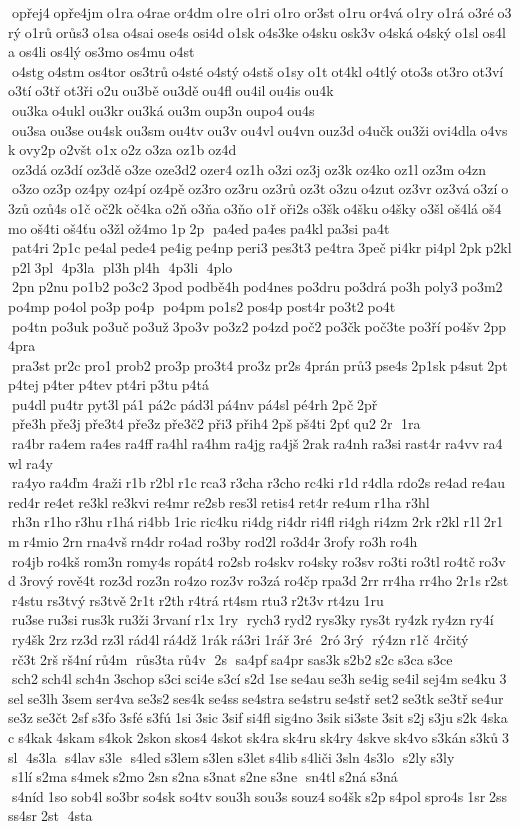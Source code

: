  opřej4 opře4jm o1ra o4rae or4dm o1re o1ri o1ro or3st o1ru or4vá o1ry o1rá o3ré o3rý o1rů orůs3 o1sa o4sai ose4s osi4d o1sk o4s3ke o4sku osk3v o4ská o4ský o1sl os4la os4li os4lý os3mo os4mu o4st  o4stg o4stm os4tor os3trů o4sté o4stý o4stš o1sy o1t ot4kl o4tlý oto3s ot3ro ot3ví o3tí o3tř ot3ři o2u ou3bě ou3dě ou4fl ou4il ou4is ou4k  ou3ka o4ukl ou3kr ou3ká ou3m oup3n oupo4 ou4s  ou3sa ou3se ou4sk ou3sm ou4tv ou3v ou4vl ou4vn ouz3d o4učk ou3ži ovi4dla o4vsk ovy2p o2všt o1x o2z o3za oz1b oz4d  oz3dá oz3dí oz3dě o3ze oze3d2 ozer4 oz1h o3zi oz3j oz3k oz4ko oz1l oz3m o4zn  o3zo oz3p oz4py oz4pí oz4pě oz3ro oz3ru oz3rů oz3t o3zu o4zut oz3vr oz3vá o3zí o3zů ozů4s o1č oč2k oč4ka o2ň o3ňa o3ňo o1ř oři2s o3šk o4šku o4šky o3šl oš4lá oš4mo oš4ti oš4ťu o3žl ož4mo 1p 2p  pa4ed pa4es pa4kl pa3si pa4t  pat4ri 2p1c pe4al pede4 pe4ig pe4np peri3 pes3t3 pe4tra 3peč pi4kr pi4pl 2pk p2kl p2l 3pl  4p3la  pl3h pl4h  4p3li  4plo  2pn p2nu po1b2 po3c2 3pod podbě4h pod4nes po3dru po3drá po3h poly3 po3m2 po4mp po4ol po3p po4p  po4pm po1s2 pos4p post4r po3t2 po4t  po4tn po3uk po3uč po3už 3po3v po3z2 po4zd poč2 po3čk poč3te po3ří po4šv 2pp 4pra  pra3st pr2c pro1 prob2 pro3p pro3t4 pro3z pr2s 4prán prů3 pse4s 2p1sk p4sut 2pt p4tej p4ter p4tev pt4ri p3tu p4tá  pu4dl pu4tr pyt3l pá1 pá2c pád3l pá4nv pá4sl pé4rh 2pč 2př  pře3h pře3j pře3t4 pře3z pře3č2 při3 přih4 2pš pš4ti 2pť qu2 2r  1ra  ra4br ra4em ra4es ra4ff ra4hl ra4hm ra4jg ra4jš 2rak ra4nh ra3si rast4r ra4vv ra4wl ra4y  ra4yo ra4ďm 4raži r1b r2bl r1c rca3 r3cha r3cho rc4ki r1d r4dla rdo2s re4ad re4au red4r re4et re3kl re3kvi re4mr re2sb res3l retis4 ret4r re4um r1ha r3hl  rh3n r1ho r3hu r1há ri4bb 1ric ric4ku ri4dg ri4dr ri4fl ri4gh ri4zm 2rk r2kl r1l 2r1m r4mio 2rn rna4vš rn4dr ro4ad ro3by rod2l ro3d4r 3rofy ro3h ro4h  ro4jb ro4kš rom3n romy4s ropát4 ro2sb ro4skv ro4sky ro3sv ro3ti ro3tl ro4tč ro3vd 3rový rově4t roz3d roz3n ro4zo roz3v ro3zá ro4čp rpa3d 2rr rr4ha rr4ho 2r1s r2st r4stu rs3tvý rs3tvě 2r1t r2th r4trá rt4sm rtu3 r2t3v rt4zu 1ru  ru3se ru3si rus3k ru3ži 3rvaní r1x 1ry  rych3 ryd2 rys3ky rys3t ry4zk ry4zn ry4í  ry4šk 2rz rz3d rz3l rád4l rá4dž 1rák rá3ri 1rář 3ré  2ró 3rý  rý4zn r1č 	4rčitý  rč3t 2rš rš4ní rů4m  růs3ta rů4v  2s  sa4pf sa4pr sas3k s2b2 s2c s3ca s3ce  sch2 sch4l sch4n 3schop s3ci sci4e s3cí s2d 1se se4au se3h se4ig se4il sej4m se4ku 3sel se3lh 3sem ser4va se3s2 ses4k se4ss se4stra se4stru se4stř set2 se3tk se3tř se4ur se3z se3čt 2sf s3fo 3sfé s3fú 1si 3sic 3sif si4fl sig4no 3sik si3ste 3sit s2j s3ju s2k 4skac s4kak 4skam s4kok 2skon skos4 4skot sk4ra sk4ru sk4ry 4skve sk4vo s3kán s3ků 3sl  4s3la  s4lav s3le  s4led s3lem s3len s3let s4lib s4liči 3sln 4s3lo  s2ly s3ly  s1lí s2ma s4mek s2mo 2sn s2na s3nat s2ne s3ne  sn4tl s2ná s3ná  s4níd 1so sob4l so3br so4sk so4tv sou3h sou3s souz4 so4šk s2p s4pol spro4s 1sr 2ss ss4sr 2st  4sta 
